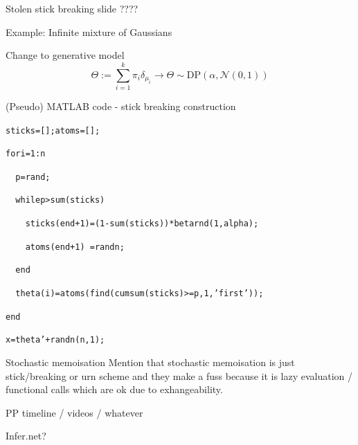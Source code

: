 \begin{frame}{Stolen stick breaking slide}
????
\end{frame}

\begin{frame}{Example: Infinite mixture of Gaussians}
  \begin{block}{Change to generative model}
    \begin{equation*}
      \Theta := \sum_{i=1}^k \pi_i \delta_{\mu_i} \to \Theta \sim \textrm{DP}(\alpha, \mathcal{N}(0,1))
    \end{equation*}
  \end{block}
  \begin{block}{(Pseudo) MATLAB code - stick breaking construction}
    \begin{alltt}
      sticks = []; atoms = [];
      
      for i = 1:n
      
      \ \ p = rand;
      
      \ \ while p > sum(sticks)
      
      \ \ \ \ sticks(end+1) = (1-sum(sticks)) * betarnd(1, alpha);
      
      \ \ \ \ atoms(end+1) \ = randn;
      
      \ \ end
      
      \ \ theta(i) = atoms(find(cumsum(sticks)>=p, 1, 'first'));
      
      end

      x = theta' + randn(n, 1);
    \end{alltt}
  \end{block}
\end{frame}

\begin{frame}{Stochastic memoisation}
Mention that stochastic memoisation is just stick/breaking or urn scheme and they make a fuss because it is lazy evaluation / functional calls which are ok due to exhangeability.
\end{frame}

\begin{frame}{PP timeline / videos / whatever}

Infer.net?
\end{frame}




